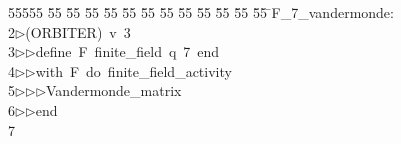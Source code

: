 %
%
\begin{tabbing}
55555 \= 55 \= 55 \= 55 \= 55 \= 55 \= 55 \= 55 \= 55 \= 55 \= 55 \= 55 \= 55 \= \>F\_7\_vandermonde:\\[0pt]
2\>$\triangleright$\>(ORBITER)\ v\ 3\ \\[0pt]
3\>$\triangleright$\>$\triangleright$\>define\ F\ finite\_field\ q\ 7\ end\ \\[0pt]
4\>$\triangleright$\>$\triangleright$\>with\ F\ do\ finite\_field\_activity\ \\[0pt]
5\>$\triangleright$\>$\triangleright$\>$\triangleright$\>Vandermonde\_matrix\ \\[0pt]
6\>$\triangleright$\>$\triangleright$\>end\\[0pt]
7\>\end{tabbing}
